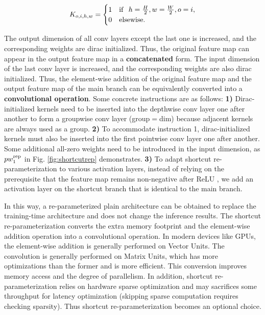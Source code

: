 \documentclass[preprint,12pt]{elsarticle}
\begin{document}
\begin{equation}
\begin{aligned}
    K_{o,i,h,w} = \begin{cases}1& {\rm if} \ \ h=\frac{H}{2}, w=\frac{W}{2}, o=i,\\0& {\rm elsewise}.\end{cases}
    \label{eq5}
\end{aligned}
\end{equation}

The output dimension of all conv layers except the last one is increased, and the corresponding weights are dirac initialized. Thus, the original feature map can appear in the output feature map in a \textbf{concatenated} form. The input dimension of the last conv layer is increased, and the corresponding weights are also dirac initialized. Thus, the element-wise addition of the original feature map and the output feature map of the main branch can be equivalently converted into a \textbf{convolutional operation}. Some concrete instructions are as follows: \textbf{1)} Dirac-initialized kernels need to be inserted into the depthwise conv layer one after another to form a groupwise conv layer (group$=$dim) because adjacent kernels are always used as a group. \textbf{2)} To accommodate instruction 1, dirac-initialized kernels must also be inserted into the first pointwise conv layer one after another. Some additional all-zero weights need to be introduced in the input dimension, as $pw_1^{\rm rep}$ in Fig. \ref{fig:shortcutrep} demonstrates. \textbf{3)} To adapt shortcut re-parameterization to various activation layers, instead of relying on the prerequisite that the feature map remains non-negative after ReLU \cite{rmnet}, we add an activation layer on the shortcut branch that is identical to the main branch. 

In this way, a re-parameterized plain architecture can be obtained to replace the training-time architecture and does not change the inference results. The shortcut re-parameterization converts the extra memory footprint and the element-wise addition operation into a convolutional operation. In modern devices like GPUs, the element-wise addition is generally performed on Vector Units. The convolution is generally performed on Matrix Units, which has more optimizations than the former and is more efficient. This conversion improves memory access and the degree of parallelism. In addition, shortcut re-parameterization relies on hardware sparse optimization and may sacrifices some throughput for latency optimization (skipping sparse computation requires checking sparsity). Thus shortcut re-parameterization becomes an optional choice.
\end{document}
